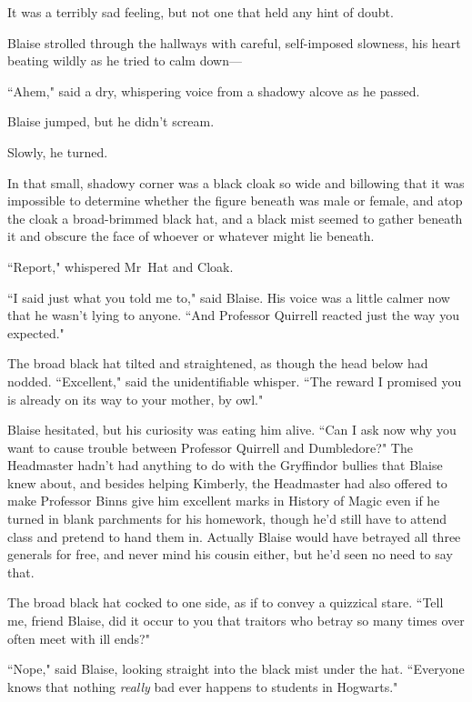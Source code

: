 It was a terribly sad feeling, but not one that held any hint of doubt.


Blaise strolled through the hallways with careful, self-imposed slowness, his heart beating wildly as he tried to calm down—

``Ahem," said a dry, whispering voice from a shadowy alcove as he passed.

Blaise jumped, but he didn't scream.

Slowly, he turned.

In that small, shadowy corner was a black cloak so wide and billowing that it was impossible to determine whether the figure beneath was male or female, and atop the cloak a broad-brimmed black hat, and a black mist seemed to gather beneath it and obscure the face of whoever or whatever might lie beneath.

``Report," whispered Mr~Hat and Cloak.

``I said just what you told me to," said Blaise. His voice was a little calmer now that he wasn't lying to anyone. ``And Professor Quirrell reacted just the way you expected."

The broad black hat tilted and straightened, as though the head below had nodded. ``Excellent," said the unidentifiable whisper. ``The reward I promised you is already on its way to your mother, by owl."

Blaise hesitated, but his curiosity was eating him alive. ``Can I ask now why you want to cause trouble between Professor Quirrell and Dumbledore?" The Headmaster hadn't had anything to do with the Gryffindor bullies that Blaise knew about, and besides helping Kimberly, the Headmaster had also offered to make Professor Binns give him excellent marks in History of Magic even if he turned in blank parchments for his homework, though he'd still have to attend class and pretend to hand them in. Actually Blaise would have betrayed all three generals for free, and never mind his cousin either, but he'd seen no need to say that.

The broad black hat cocked to one side, as if to convey a quizzical stare. ``Tell me, friend Blaise, did it occur to you that traitors who betray so many times over often meet with ill ends?"

``Nope," said Blaise, looking straight into the black mist under the hat. ``Everyone knows that nothing \emph{really} bad ever happens to students in Hogwarts."

